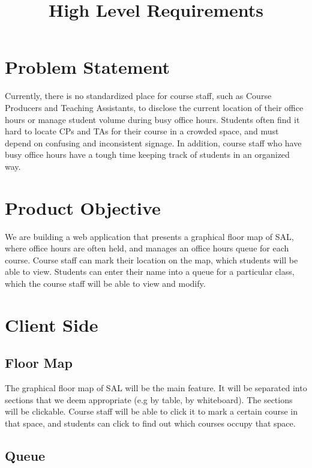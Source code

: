 \documentclass{article}
\title{High Level Requirements}
\date{\vspace{-10ex}}
\begin{document}
\maketitle

\section*{Problem Statement}

Currently, there is no standardized place for course staff, such as Course Producers and Teaching Assistants, to disclose the current location of their office hours or manage student volume during busy office hours. Students often find it hard to locate CPs and TAs for their course in a crowded space, and must depend on confusing and inconsistent signage. In addition, course staff who have busy office hours have a tough time keeping track of students in an organized way.

\section*{Product Objective}

We are building a web application that presents a graphical floor map of SAL, where office hours are often held, and manages an office hours queue for each course. Course staff can mark their location on the map, which students will be able to view. Students can enter their name into a queue for a particular class, which the course staff will be able to view and modify.

\section*{Client Side}

\subsection*{Floor Map}

The graphical floor map of SAL will be the main feature. It will be separated into sections that we deem appropriate (e.g by table, by whiteboard). The sections will be clickable. Course staff will be able to click it to mark a certain course in that space, and students can click to find out which courses occupy that space.

\subsection*{Queue}
\end{document}
